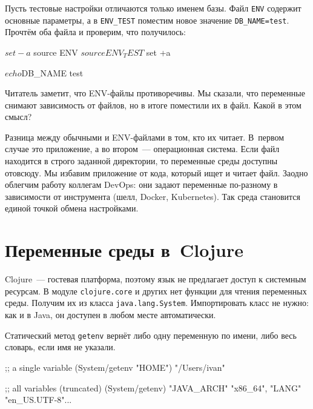 Пусть тестовые настройки отличаются только именем базы. Файл \verb|ENV| содержит
основные параметры, а в \verb|ENV_TEST| поместим новое значение
\verb|DB_NAME=test|. Прочтём оба файла и проверим, что получилось:

\begin{english}
  \begin{bash}
$ set -a
$ source ENV
$ source ENV_TEST
$ set +a

$ echo $DB_NAME
test
  \end{bash}
\end{english}

Читатель заметит, что ENV-файлы противоречивы. Мы сказали, что переменные
снимают зависимость от файлов, но в итоге поместили их в файл. Какой в этом
смысл?


Разница между обычными и ENV-файлами в том, кто их читает. В~первом случае это
приложение, а во втором~--- операционная система. Если файл находится в строго
заданной директории, то переменные среды доступны отовсюду. Мы избавим
приложение от кода, который ищет и читает файл. Заодно облегчим работу коллегам
DevOps: они задают переменные по-разному в зависимости от инструмента (шелл,
Docker, Kubernetes). Так среда становится единой точкой обмена настройками.

\section{Переменные среды в~Clojure}


Clojure~--- гостевая платформа, поэтому язык не предлагает доступ к системным
ресурсам. В модуле \verb|clojure.core| и других нет функции для чтения
переменных среды. Получим их из класса \verb|java.lang.System|. Импортировать
класс не нужно: как и в Java, он доступен в любом месте автоматически.

Статический метод \verb|getenv| вернёт либо одну переменную по имени, либо
весь словарь, если имя не указали.

\ifx\DEVICETYPE\MOBILE

\begin{english}
  \begin{clojure}
;; a single variable
(System/getenv "HOME")
"/Users/ivan"

;; all variables (truncated)
(System/getenv)
{"JAVA_ARCH" "x86_64",
 "LANG" "en_US.UTF-8"...}
  \end{clojure}
\end{english}

